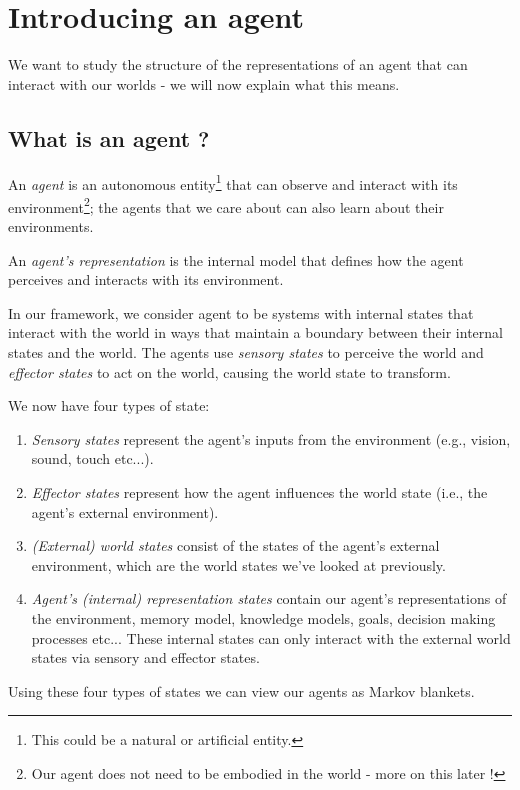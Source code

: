 \section{Introducing an agent}
We want to study the structure of the representations of an agent that can interact with our worlds - we will now explain what this means.

\subsection{What is an agent ?}

An \emph{agent} is an autonomous entity\footnote{This could be a natural or artificial entity.} that can observe and interact with its environment\footnote{Our agent does not need to be embodied in the world - more on this later !}; the agents that we care about can also learn about their environments.

An \emph{agent's representation} is the internal model that defines how the agent perceives and interacts with its environment.

In our framework, we consider agent to be systems with internal states that interact with the world in ways that maintain a boundary between their internal states and the world.
The agents use \emph{sensory states} to perceive the world and \emph{effector states} to act on the world, causing the world state to transform.

We now have four types of state:
\begin{enumerate}
    \item \emph{Sensory states} represent the agent's inputs from the environment (e.g., vision, sound, touch etc...).
    \item \emph{Effector states} represent how the agent influences the world state (i.e., the agent's external environment).
    \item \emph{(External) world states} consist of the states of the agent's external environment, which are the world states we've looked at previously.
    \item \emph{Agent's (internal) representation states} contain our agent's representations of the environment, memory model, knowledge models, goals, decision making processes etc... These internal states can only interact with the external world states via sensory and effector states.
\end{enumerate}

Using these four types of states we can view our agents as Markov blankets.

